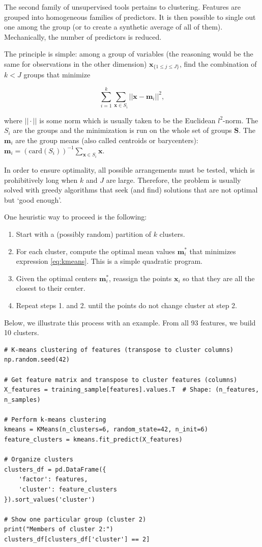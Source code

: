 The second family of unsupervised tools pertains to clustering. Features are grouped into homogeneous families of predictors. It is then possible to single out one among the group (or to create a synthetic average of all of them). Mechanically, the number of predictors is reduced.

The principle is simple: among a group of variables (the reasoning would be the same for observations in the other dimension) $\textbf{x}_{\{1 \le j \le J\}}$, find the combination of $k<J$ groups that minimize

\begin{equation}
\label{eq:kmeans}
\sum_{i=1}^k\sum_{\textbf{x}\in S_i}||\textbf{x}-\textbf{m}_i||^2,
\end{equation}

where $||\cdot ||$ is some norm which is usually taken to be the Euclidean $l^2$-norm. The $S_i$ are the groups and the minimization is run on the whole set of groups $\textbf{S}$. The $\textbf{m}_i$ are the group means (also called centroids or barycenters): $\textbf{m}_i=(\text{card}(S_i))^{ -1}\sum_{\textbf{x}\in S_i}\textbf{x}$.

In order to ensure optimality, all possible arrangements must be tested, which is prohibitively long when $k$ and $J$ are large. Therefore, the problem is usually solved with greedy algorithms that seek (and find) solutions that are not optimal but `good enough'.

One heuristic way to proceed is the following:

\begin{enumerate}[resume]
\item Start with a (possibly random) partition of $k$ clusters.
\item For each cluster, compute the optimal mean values $\textbf{m}_i^*$ that minimizes expression \ref{eq:kmeans}. This is a simple quadratic program.
\item Given the optimal centers $\textbf{m}_i^*$, reassign the points $\textbf{x}_i$ so that they are all the closest to their center.
\item Repeat steps 1. and 2. until the points do not change cluster at step 2.
\end{enumerate}

Below, we illustrate this process with an example. From all 93 features, we build 10 clusters.

\begin{verbatim}
# K-means clustering of features (transpose to cluster columns)
np.random.seed(42)

# Get feature matrix and transpose to cluster features (columns)
X_features = training_sample[features].values.T  # Shape: (n_features, n_samples)

# Perform k-means clustering
kmeans = KMeans(n_clusters=6, random_state=42, n_init=6)
feature_clusters = kmeans.fit_predict(X_features)

# Organize clusters
clusters_df = pd.DataFrame({
    'factor': features,
    'cluster': feature_clusters
}).sort_values('cluster')

# Show one particular group (cluster 2)
print("Members of cluster 2:")
clusters_df[clusters_df['cluster'] == 2]
\end{verbatim}

